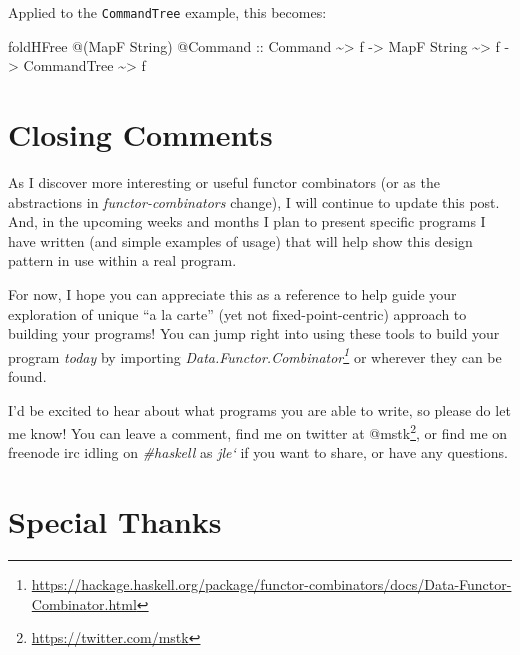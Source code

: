 \documentclass[]{article}
\newenvironment{Shaded}{}{}
\newcommand{\DataTypeTok}[1]{\textcolor[rgb]{0.56,0.13,0.00}{#1}}
\newcommand{\NormalTok}[1]{#1}
\newcommand{\OperatorTok}[1]{\textcolor[rgb]{0.40,0.40,0.40}{#1}}
\newcommand{\OtherTok}[1]{\textcolor[rgb]{0.00,0.44,0.13}{#1}}
\renewcommand{\href}[2]{#2\footnote{\url{#1}}}
\begin{document}
\begin{itemize}
  Applied to the \texttt{CommandTree} example, this becomes:

\begin{Shaded}
\begin{Highlighting}[]
\NormalTok{foldHFree }\OperatorTok{@}\NormalTok{(}\DataTypeTok{MapF} \DataTypeTok{String}\NormalTok{) }\OperatorTok{@}\DataTypeTok{Command}
\OtherTok{    ::} \DataTypeTok{Command} \OperatorTok{\textasciitilde{}\textgreater{}}\NormalTok{ f}
    \OtherTok{{-}\textgreater{}} \DataTypeTok{MapF} \DataTypeTok{String} \OperatorTok{\textasciitilde{}\textgreater{}}\NormalTok{ f}
    \OtherTok{{-}\textgreater{}} \DataTypeTok{CommandTree} \OperatorTok{\textasciitilde{}\textgreater{}}\NormalTok{ f}
\end{Highlighting}
\end{Shaded}
\end{itemize}

\section{Closing Comments}\label{closing-comments}

As I discover more interesting or useful functor combinators (or as the
abstractions in \emph{functor-combinators} change), I will continue to update
this post. And, in the upcoming weeks and months I plan to present specific
programs I have written (and simple examples of usage) that will help show this
design pattern in use within a real program.

For now, I hope you can appreciate this as a reference to help guide your
exploration of unique ``a la carte'' (yet not fixed-point-centric) approach to
building your programs! You can jump right into using these tools to build your
program \emph{today} by importing
\emph{\href{https://hackage.haskell.org/package/functor-combinators/docs/Data-Functor-Combinator.html}{Data.Functor.Combinator}}
or wherever they can be found.

I'd be excited to hear about what programs you are able to write, so please do
let me know! You can leave a comment, find me on
\href{https://twitter.com/mstk}{twitter at @mstk}, or find me on freenode irc
idling on \emph{\#haskell} as \emph{jle`} if you want to share, or have any
questions.

\section{Special Thanks}\label{special-thanks}
\end{document}
